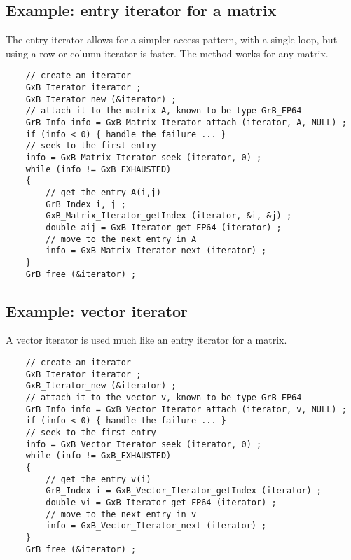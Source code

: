 \documentclass[12pt]{article}
\begin{document}
{%
\newpage
\subsection{Example: entry iterator for a matrix}

The entry iterator allows for a simpler access pattern, with a single loop, but
using a row or column iterator is faster.  The method works for any matrix.

    {\footnotesize
    \begin{verbatim}
    // create an iterator
    GxB_Iterator iterator ;
    GxB_Iterator_new (&iterator) ;
    // attach it to the matrix A, known to be type GrB_FP64
    GrB_Info info = GxB_Matrix_Iterator_attach (iterator, A, NULL) ;
    if (info < 0) { handle the failure ... }
    // seek to the first entry
    info = GxB_Matrix_Iterator_seek (iterator, 0) ;
    while (info != GxB_EXHAUSTED)
    {
        // get the entry A(i,j)
        GrB_Index i, j ;
        GxB_Matrix_Iterator_getIndex (iterator, &i, &j) ;
        double aij = GxB_Iterator_get_FP64 (iterator) ;
        // move to the next entry in A
        info = GxB_Matrix_Iterator_next (iterator) ;
    }
    GrB_free (&iterator) ; \end{verbatim}}

\subsection{Example: vector iterator}

A vector iterator is used much like an entry iterator for a matrix.

    {\footnotesize
    \begin{verbatim}
    // create an iterator
    GxB_Iterator iterator ;
    GxB_Iterator_new (&iterator) ;
    // attach it to the vector v, known to be type GrB_FP64
    GrB_Info info = GxB_Vector_Iterator_attach (iterator, v, NULL) ;
    if (info < 0) { handle the failure ... }
    // seek to the first entry
    info = GxB_Vector_Iterator_seek (iterator, 0) ;
    while (info != GxB_EXHAUSTED)
    {
        // get the entry v(i)
        GrB_Index i = GxB_Vector_Iterator_getIndex (iterator) ;
        double vi = GxB_Iterator_get_FP64 (iterator) ;
        // move to the next entry in v
        info = GxB_Vector_Iterator_next (iterator) ;
    }
    GrB_free (&iterator) ; \end{verbatim}}

}
\end{document}
